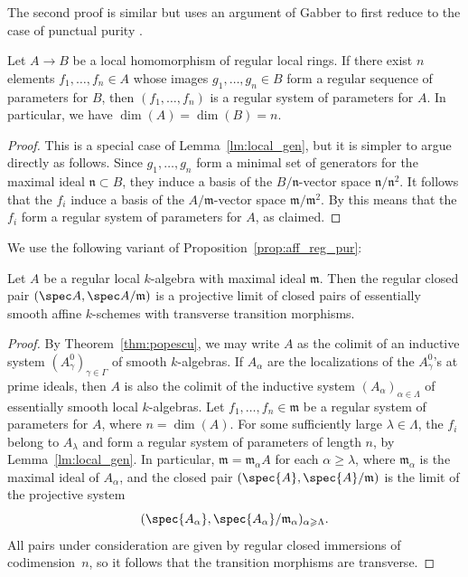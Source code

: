 \begin{num}
The second proof is similar but uses an argument of Gabber to first reduce to the case of punctual purity \cite[XVI\,3.2]{Gabber}.

\begin{lm}\label{lm:local_gen_max}
Let $A \to B$ be a local homomorphism of regular local rings.
If there exist $n$ elements $f_1,\ldots,f_n \in A$ whose images $g_1,\ldots,g_n \in B$ form a regular sequence of parameters for $B$, then $(f_1,\ldots,f_n)$ is a regular system of parameters for $A$.
In particular, we have $\dim(A) = \dim(B) = n$.
\end{lm}

\begin{proof}
This is a special case of Lemma~\ref{lm:local_gen}, but it is simpler to argue directly as follows.
Since $g_1,\ldots,g_n$ form a minimal set of generators for the maximal ideal $\mathfrak{n} \subset B$, they induce a basis of the $B/\mathfrak{n}$-vector space $\mathfrak{n}/\mathfrak{n}^2$.
It follows that the $f_i$ induce a basis of the $A/\mathfrak{m}$-vector space $\mathfrak{m}/\mathfrak{m}^2$.
By \cite[0, Prop.\,17.1.7]{EGA4} this means that the $f_i$ form a regular system of parameters for $A$, as claimed.
\end{proof}

We use the following variant of Proposition~\ref{prop:aff_reg_pur}:
\begin{prop}
\label{prop:local_pur}
Let $A$ be a regular local $k$-algebra with maximal ideal $\mathfrak{m}$. Then the regular closed pair $(\spec A, \spec A/\mathfrak{m})$ is a projective limit of closed pairs of essentially smooth affine $k$-schemes with transverse transition morphisms.
\end{prop}
\begin{proof}
By Theorem~\ref{thm:popescu}, we may write $A$ as the colimit of an inductive system $(A^0_\gamma)_{\gamma\in\Gamma}$ of smooth $k$-algebras.
If $A_\alpha$ are the localizations of the $A^0_\gamma$'s at prime ideals, then $A$ is also the colimit of the inductive system $(A_\alpha)_{\alpha\in\Lambda}$ of essentially smooth local $k$-algebras.
Let $f_1,\ldots,f_n \in \mathfrak{m}$ be a regular system of parameters for $A$, where $n = \dim(A)$.
For some sufficiently large $\lambda\in\Lambda$, the $f_i$ belong to $A_\lambda$ and form a regular system of parameters of length $n$, by Lemma~\ref{lm:local_gen}.
In particular, $\mathfrak{m} = \mathfrak{m}_\alpha A$ for each $\alpha\geqslant\lambda$, where $\mathfrak{m}_\alpha$ is the maximal ideal of $A_\alpha$, and the closed pair $(\spec{A}, \spec{A}/\mathfrak{m})$ is the limit of the projective system
\begin{equation*}
(\spec{A_\alpha}, \spec{A_\alpha}/\mathfrak{m}_\alpha)_{\alpha\geqslant\Lambda}.
\end{equation*}
All pairs under consideration are given by regular closed immersions of codimension~$n$, so it follows that the transition morphisms are transverse.
\end{proof}


\end{num}
